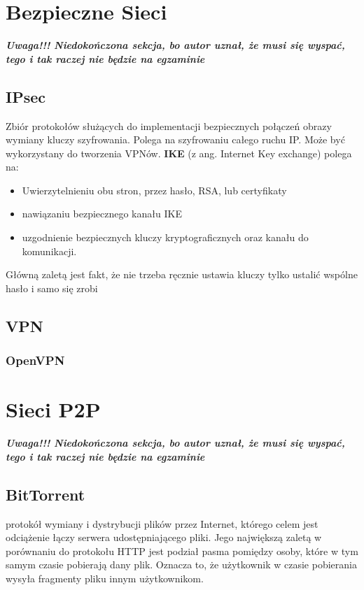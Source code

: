 \documentclass[]{article}
\begin{document}
\section{Bezpieczne Sieci}
\textbf{\emph{Uwaga!!! Niedokończona sekcja, bo autor uznał, że musi się wyspać, tego i tak raczej nie będzie na egzaminie}}\\
\subsection{IPsec}
Zbiór protokołów służących do implementacji bezpiecznych połączeń obrazy wymiany kluczy szyfrowania. Polega na szyfrowaniu całego ruchu IP. Może być wykorzystany do tworzenia VPNów. 
\textbf{IKE} (z ang. Internet Key exchange) polega na:
\begin{itemize}
    \item Uwierzytelnieniu obu stron, przez hasło, RSA, lub certyfikaty
    \item nawiązaniu bezpiecznego kanału IKE
    \item uzgodnienie bezpiecznych kluczy kryptograficznych oraz kanału do komunikacji.
\end{itemize}
Główną zaletą jest fakt, że nie trzeba ręcznie ustawia kluczy tylko ustalić wspólne hasło i samo się zrobi
\subsection{VPN}
\subsubsection{OpenVPN}
\section{Sieci P2P} 
\textbf{\emph{Uwaga!!! Niedokończona sekcja, bo autor uznał, że musi się wyspać, tego i tak raczej nie będzie na egzaminie}}\\
\subsection{BitTorrent}
protokół wymiany i dystrybucji plików przez Internet, którego celem jest odciążenie łączy serwera udostępniającego pliki. Jego największą zaletą w porównaniu do protokołu HTTP jest podział pasma pomiędzy osoby, które w tym samym czasie pobierają dany plik. Oznacza to, że użytkownik w czasie pobierania wysyła fragmenty pliku innym użytkownikom.
\\\\
\end{document}
